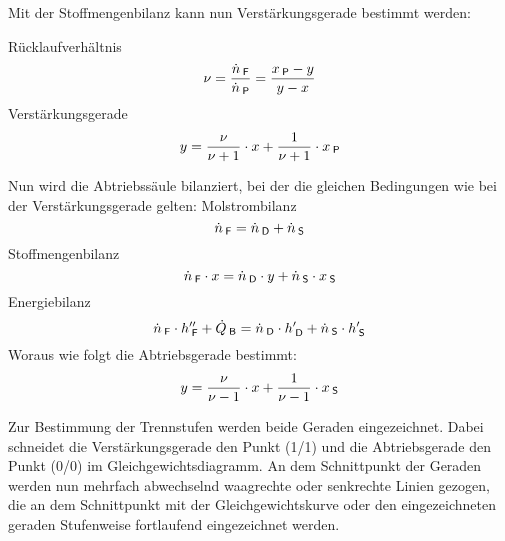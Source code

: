 \documentclass[12pt,a4paper,bibtotocnumbered,liststotocnumbered]{scrreprt}
\begin{document}
Mit der Stoffmengenbilanz kann nun Verstärkungsgerade bestimmt werden:

Rücklaufverhältnis
\begin{equation}
\nu = \frac{\dot{n}_{\: \mathsf{F}}}{\dot{n}_{\: \mathsf{P}}} = \frac{x_{\: \mathsf{P}} - y}{y - x}
\end{equation}
Verstärkungsgerade
\begin{equation}
y = \frac{\nu}{\nu + 1} \cdot x + \frac{1}{\nu + 1} \cdot x_{\: \mathsf{P}}
\end{equation}

Nun wird die Abtriebssäule bilanziert, bei der die gleichen Bedingungen wie bei der Verstärkungsgerade gelten:
Molstrombilanz
\begin{equation}
\dot{n}_{\: \mathsf{F}} = \dot{n}_{\: \mathsf{D}} + \dot{n}_{\: \mathsf{S}}
\end{equation}
Stoffmengenbilanz
\begin{equation}
\dot{n}_{\: \mathsf{F}} \cdot x= \dot{n}_{\: \mathsf{D}} \cdot y + \dot{n}_{\: \mathsf{S}} \cdot x_{\: \mathsf{S}}
\end{equation}
Energiebilanz
\begin{equation}
\dot{n}_{\: \mathsf{F}} \cdot h_{\: \mathsf{F}}'' + \dot{Q}_{\: \mathsf{B}}= \dot{n}_{\: \mathsf{D}} \cdot h_{\: \mathsf{D}}'  + \dot{n}_{\: \mathsf{S}} \cdot h_{\: \mathsf{S}}'
\end{equation}
Woraus wie folgt die Abtriebsgerade bestimmt:
\begin{equation}
y = \frac{\nu}{\nu - 1} \cdot x + \frac{1}{\nu - 1} \cdot x_{\: \mathsf{S}}
\end{equation}



Zur Bestimmung der Trennstufen werden beide Geraden eingezeichnet. Dabei schneidet die Verstärkungsgerade den Punkt (1/1) und die Abtriebsgerade den Punkt (0/0) im Gleichgewichtsdiagramm. An dem Schnittpunkt der Geraden werden nun mehrfach abwechselnd waagrechte oder senkrechte Linien gezogen, die an dem Schnittpunkt mit der Gleichgewichtskurve oder den eingezeichneten geraden Stufenweise fortlaufend eingezeichnet werden. \cite{Sievers}


\newpage
\end{document}
